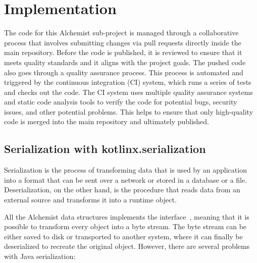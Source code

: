 \chapter{Implementation}
\label{chap:implementation}
\begin{info}
	The code for this Alchemist sub-project is managed through a collaborative process that involves submitting changes via pull requests directly inside the main repository. Before the code is published, it is reviewed to ensure that it meets quality standards and it aligns with the project goals. The pushed code also goes through a quality assurance process. This process is automated and triggered by the continuous integration (CI) system, which runs a series of tests and checks out the code. The CI system uses multiple quality assurance systems and static code analysis tools to verify the code for potential bugs, security issues, and other potential problems. This helps to ensure that only high-quality code is merged into the main repository and ultimately published.
\end{info}
\section{Serialization with kotlinx.serialization}
\label{sec:serialization-with-kotlinx-serialization}
Serialization is the process of transforming data that is used by an application into a format that can be sent over a network or stored in a database or a file. Deserialization, on the other hand, is the procedure that reads data from an external source and transforms it into a runtime object.\newline

All the Alchemist data structures implements the  interface~\cite{Serializ95:online}, meaning that it is possible to transform every object into a byte stream. The byte stream can be either saved to disk or transported to another system, where it can finally be deserialized to recreate the original object. However, there are several problems with Java serialization:

